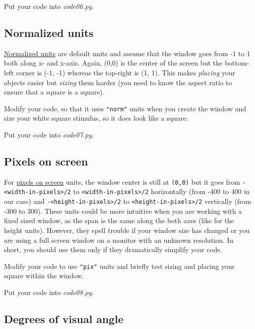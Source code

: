 \documentclass[
]{book}
\begin{document}
Put your code into \emph{code06.py}.

\hypertarget{psychopy-units-norm}{%
\subsection{Normalized units}\label{psychopy-units-norm}}

\href{https://psychopy.org/general/units.html\#normalised-units}{Normalized units} are default units and assume that the window goes from -1 to 1 both along x- and x-axis. Again, (0,0) is the center of the screen but the bottom-left corner is (-1, -1) whereas the top-right is (1, 1). This makes \emph{placing} your objects easier but \emph{sizing} them harder (you need to know the aspect ratio to ensure that a square is a square).

Modify your code, so that it uses \texttt{"norm"} units when you create the window and size your white square stimulus, so it does look like a square.

Put your code into \emph{code07.py}.

\hypertarget{pixels-on-screen}{%
\subsection{Pixels on screen}\label{pixels-on-screen}}

For \href{https://psychopy.org/general/units.html\#pixels-on-screen}{pixels on screen} units, the window center is still at \texttt{(0,0)} but it goes from \texttt{-\textless{}width-in-pixels\textgreater{}/2} to \texttt{\textless{}width-in-pixels\textgreater{}/2} horizontally (from -400 to 400 in our case) and \texttt{-\textless{}height-in-pixels\textgreater{}/2} to \texttt{\textless{}height-in-pixels\textgreater{}/2} vertically (from -300 to 300). These units could be more intuitive when you are working with a fixed sized window, as the span is the same along the both axes (like for the height units). However, they spell trouble if your window size has changed or you are using a full screen window on a monitor with an unknown resolution. In short, you should use them only if they dramatically simplify your code.

Modify your code to use \texttt{"pix"} units and briefly test sizing and placing your square within the window.

Put your code into \emph{code08.py}.

\hypertarget{degrees-of-visual-angle}{%
\subsection{Degrees of visual angle}\label{degrees-of-visual-angle}}
\end{document}
